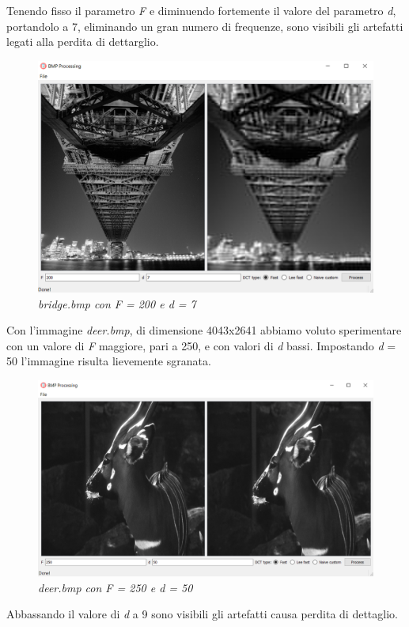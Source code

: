 \documentclass[a4paper,12pt]{report}
\begin{document}
\noindent Tenendo fisso il parametro \textit{F} e diminuendo fortemente il valore del parametro \textit{d}, portandolo a 7, eliminando un gran numero di frequenze, sono visibili gli artefatti legati alla perdita di dettarglio.

\begin{figure}[H]
\centering
\includegraphics[width=0.8\linewidth]{../img/bridge_200_7.png}
\caption{\textit{bridge.bmp con F = 200 e d = 7}}
\end{figure}

\noindent Con l'immagine \textit{deer.bmp}, di dimensione 4043x2641 abbiamo voluto sperimentare con un valore di \textit{F} maggiore, pari a 250, e con valori di \textit{d} bassi.
Impostando \textit{d} = 50 l'immagine risulta lievemente sgranata.

\begin{figure}[H]
\centering
\includegraphics[width=0.8\linewidth]{../img/bambi_250_50.png}
\caption{\textit{deer.bmp con F = 250 e d = 50}}
\end{figure}

\noindent Abbassando il valore di \textit{d} a 9 sono visibili gli artefatti causa perdita di dettaglio.
\end{document}
